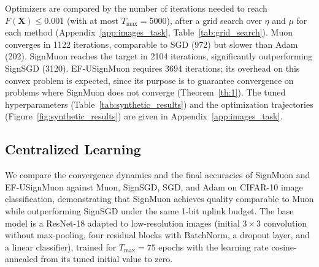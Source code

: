 \documentclass{article}
\begin{document}
Optimizers are compared by the number of iterations needed to reach $F(\mathbf{X}) \le 0.001$ (with at most $T_{\max} = 5000$), after a grid search over $\eta$ and $\mu$ for each method (Appendix~\ref{app:images_task}, Table~\ref{tab:grid_search}). Muon converges in 1122 iterations, comparable to SGD (972) but slower than Adam (202). SignMuon reaches the target in 2104 iterations, significantly outperforming SignSGD (3120). EF-USignMuon requires 3694 iterations; its overhead on this convex problem is expected, since its purpose is to guarantee convergence on problems where SignMuon does not converge (Theorem~\ref{th:1}). The tuned hyperparameters (Table~\ref{tab:synthetic_results}) and the optimization trajectories (Figure~\ref{fig:synthetic_results}) are given in Appendix~\ref{app:images_task}.

\subsection{Centralized Learning}
We compare the convergence dynamics and the final accuracies of SignMuon and EF-USignMuon against Muon, SignSGD, SGD, and Adam on CIFAR-10 image classification, demonstrating that SignMuon achieves quality comparable to Muon while outperforming SignSGD under the same 1-bit uplink budget. The base model is a ResNet-18 adapted to low-resolution images (initial $3\times3$ convolution without max-pooling, four residual blocks with BatchNorm, a dropout layer, and a linear classifier), trained for $T_{\max}=75$ epochs with the learning rate cosine-annealed from its tuned initial value to zero.
\end{document}
